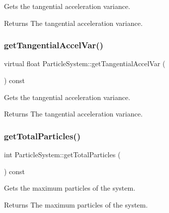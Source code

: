 Gets the tangential acceleration variance.

\begin{DoxyReturn}{Returns}
The tangential acceleration variance. 
\end{DoxyReturn}
\mbox{\label{classParticleSystem_aaf47f9a0f7445f2b9f93981ac355b79b}} 
\subsubsection{\texorpdfstring{get\+Tangential\+Accel\+Var()}{getTangentialAccelVar()}\hspace{0.1cm}{\footnotesize\ttfamily [2/2]}}
{\footnotesize\ttfamily virtual float Particle\+System\+::get\+Tangential\+Accel\+Var (\begin{DoxyParamCaption}{ }\end{DoxyParamCaption}) const\hspace{0.3cm}{\ttfamily [virtual]}}

Gets the tangential acceleration variance.

\begin{DoxyReturn}{Returns}
The tangential acceleration variance. 
\end{DoxyReturn}
\mbox{\label{classParticleSystem_a4a2fef62f24bc8cf75e5c4d05e464f03}} 
\subsubsection{\texorpdfstring{get\+Total\+Particles()}{getTotalParticles()}\hspace{0.1cm}{\footnotesize\ttfamily [1/2]}}
{\footnotesize\ttfamily int Particle\+System\+::get\+Total\+Particles (\begin{DoxyParamCaption}{ }\end{DoxyParamCaption}) const\hspace{0.3cm}{\ttfamily [virtual]}}

Gets the maximum particles of the system.

\begin{DoxyReturn}{Returns}
The maximum particles of the system. 
\end{DoxyReturn}
\mbox{\label{classParticleSystem_a09eb5e6f6ed6f871c3aa786f5bc38a2c}} 
